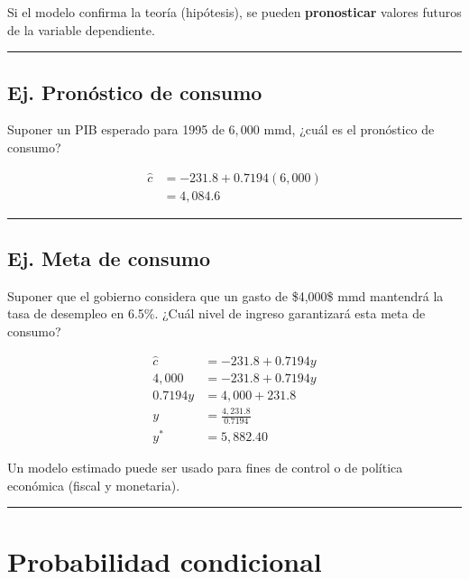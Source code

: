 \documentclass[
]{book}
\begin{document}
Si el modelo confirma la teoría (hipótesis), se pueden \textbf{pronosticar} valores futuros de la variable dependiente.

\begin{center}\rule{0.5\linewidth}{0.5pt}\end{center}

\hypertarget{ej.-pronuxf3stico-de-consumo}{%
\subsection{Ej. Pronóstico de consumo}\label{ej.-pronuxf3stico-de-consumo}}

Suponer un PIB esperado para 1995 de \(6,000\) mmd, ¿cuál es el pronóstico de consumo?

\[
\begin{align*} 
\hat{c} &= -231.8 + 0.7194(6,000) \\ 
&= 4,084.6 
\end{align*}
\]

\begin{center}\rule{0.5\linewidth}{0.5pt}\end{center}

\hypertarget{ej.-meta-de-consumo}{%
\subsection{Ej. Meta de consumo}\label{ej.-meta-de-consumo}}

Suponer que el gobierno considera que un gasto de \$4,000\$ mmd mantendrá la tasa de desempleo en 6.5\%. ¿Cuál nivel de ingreso garantizará esta meta de consumo?

\[
\begin{align*} 
\hat{c} &= -231.8 + 0.7194y \\
4,000 &= -231.8 + 0.7194y \\ 
0.7194y &= 4,000 + 231.8 \\ 
y &= \frac{4,231.8}{0.7194} \\ 
y^* &= 5,882.40 
\end{align*}
\]

Un modelo estimado puede ser usado para fines de control o de política económica (fiscal y monetaria).

\begin{center}\rule{0.5\linewidth}{0.5pt}\end{center}

\hypertarget{probabilidad-condicional}{%
\section{Probabilidad condicional}\label{probabilidad-condicional}}
\end{document}
